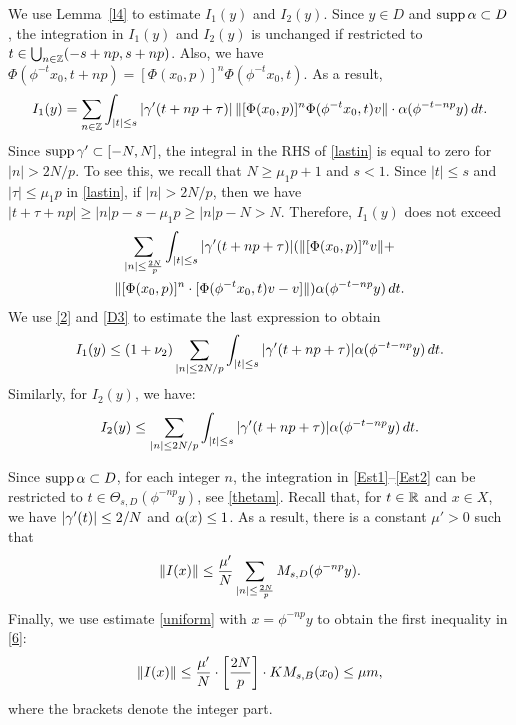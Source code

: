 We use Lemma~\ref{l4} to estimate $I_1(y)$ and $I_2(y)$.  Since $y\in D$
and $\operatorname{supp} \alpha \subset D$, the integration in $I_1(y)$ and $I_2(y)$ is
unchanged if restricted to
$t\in \bigcup_{n\in {\Bbb{Z}}} (-s +np, s+np)$.  Also, we have
$\Phi (\phi^{-t} x_0, t+np) = [\Phi (x_0, p)]^n \Phi (\phi^{-t} x_0, t)$.
As a result,
\begin{equation}\lb{lastin}
I_1 (y) 
 =  \sum_{n\in\bbZ} \int_{|t| \leq s} |\gam' (t+ np + \tau) | \, \|
[\Phi(x_0, p)]^n \Phi (\phi^{-t} x_0, t) v\| 
\cdot \al (\phi^{-t-np} y) \,dt.
\end{equation}
Since $\operatorname{supp} \gamma' \subset [-N, N]$, the integral in the RHS of
\eqref{lastin} is equal to zero for $|n| > 2N/p$. To see this,
we recall that $N\geq \mu_1p+1$ and $s<1$. Since $|t|\leq s$ and
$|\tau|\leq \mu_1p$ in \eqref{lastin}, if $|n| > 2N/p$, then we have
$|t+\tau+np|\geq |n|p-s-\mu_1p\geq |n|p-N > N$.
Therefore, $I_1(y)$ does not exceed
\begin{multline*}
\sum_{|n|\leq \frac{2N}p} \int_{|t| \leq s} |\gamma' (t+np + \tau)| 
( \| [\Phi (x_0, p)]^n v\| +\\ 
 \| [\Phi (x_0, p)]^n\cdot [ \Phi (\phi^{-t} x_0, t) v-v]\| ) 
\alpha(\phi^{-t- np} y) \, dt.
\end{multline*}
We use \eqref{2} and \eqref{D3} to estimate the last expression to obtain
\begin{equation}
I_1(y) \leq \left( 1+ \nu_2 \right) \sum_{|n|\leq 2N/p} \int_{|t|
\leq s}
|\gam'(t+np + \tau) | \al (\phi^{-t- np} y) \, dt.
\lb{Est1}
\end{equation}
Similarly, for $I_2(y)$, we have:
\begin{equation}
I_2 (y) \leq \sum_{|n|\leq 2N/p} \int_{|t| \leq s} 
| \gam' (t+ np + \tau) |
\al (\phi^{-t-np} y) \, dt.
\lb{Est2}
\end{equation}

Since $\operatorname{supp}\alpha\subset D$, 
for each integer $n$, the integration in \eqref{Est1}--\eqref{Est2}
can be restricted to $t\in\Theta_{s,D}(\phi^{-np}y)$, see
\eqref{thetam}.
Recall that, for $t\in {\Bbb{R}}$ and $x\in X$, 
we have $|\gamma'(t)| \leq 2/N$ and 
$\alpha(x) \leq 1$. 
As a result, there is a constant $\mu'>0$ such that
\begin{equation}
\| I(x)\| \leq \dfrac{\mu'}N \sum_{|n| \leq 
\frac{2N}p} M_{s,D} (\phi^{-np}y).
\lb{7}
\end{equation}
Finally, we use estimate \eqref{uniform} with $x=\phi^{-np} y$
to obtain the
first inequality in \eqref{6}:
\begin{equation}\lb{eestIprime}
\| I(x) \| \leq \dfrac{\mu'}N \cdot \left[ \dfrac{2N}p\right] \cdot
KM_{s,B} (x_0) \leq \mu m,
\end{equation}
where the brackets denote the integer part.


